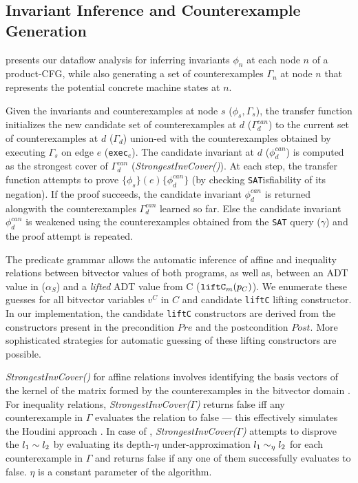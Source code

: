 


\subsection{Invariant Inference and Counterexample Generation}
\label{sec:invinference}

 presents our dataflow analysis for inferring invariants $\phi_n$
at each node $n$ of a product-CFG, while also generating a set of counterexamples $\Gamma_n$ at node $n$
that represents the potential concrete machine states at $n$.

Given the invariants and counterexamples at node $s$
($\phi_s,\Gamma_s$),
the transfer function initializes the new candidate set
of counterexamples at $d$ ($\Gamma^{can}_{d}$)
to the current set of counterexamples at $d$ ($\Gamma_{d}$) union-ed with
the counterexamples obtained by executing $\Gamma_s$ on edge $e$ ({\tt exec$_e$}).
The candidate invariant at $d$ ($\phi^{can}_d$) is computed
as the strongest cover of $\Gamma^{can}_{d}$ ({\em StrongestInvCover()}).
At each step, the transfer function attempts to prove
$\{\phi_s\} (e) \{\phi^{can}_d\}$ (by checking {\tt SAT}isfiability of its
negation). If the proof succeeds, the candidate invariant $\phi^{can}_d$ is
returned alongwith the counterexamples $\Gamma^{can}_d$ learned so far.
Else the candidate invariant $\phi^{can}_d$ is weakened using
the counterexamples obtained from the {\tt SAT} query ($\gamma$) and the proof attempt is
repeated.

The predicate grammar allows the automatic inference of
affine and inequality relations between bitvector values of both
programs, as well as, \recursiveRelations{} between an ADT value in \SpecL{} ($\alpha_S$)
and a {\em lifted} ADT value from C (${\tt liftC}_m(p_C)$).
We enumerate these \recursiveRelation{}
guesses for all bitvector variables $v^{C}$ in $C$ and candidate {\tt liftC} lifting constructor.
In our implementation, the candidate
{\tt liftC}
constructors are derived from the constructors
present in the precondition $Pre$
and the postcondition $Post$.  More
sophisticated strategies for automatic guessing of
these lifting constructors
are possible.

{\em StrongestInvCover()} for affine relations involves
identifying the basis vectors of the kernel of the
matrix formed by the counterexamples in the bitvector
domain \cite{esop05,semalign}.
For inequality relations, {\em StrongestInvCover($\Gamma$)}
returns false iff any counterexample in $\Gamma$ evaluates the
relation to false --- this effectively simulates the Houdini approach \cite{houdini}.
In case of \recursiveRelations{}, {\em StrongestInvCover($\Gamma$)}
attempts to disprove the \recursiveRelation{} $l_1 \sim{} l_2$ by evaluating
its depth-$\eta$ under-approximation $l_1 \sim_\eta l_2$ for each counterexample
in $\Gamma$ and returns false if any one of them successfully evaluates to false.
$\eta$ is a constant parameter of the algorithm.

